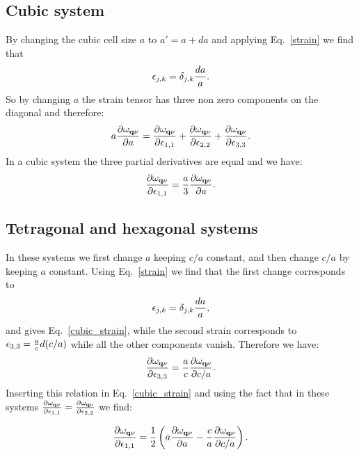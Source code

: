 \documentclass[12pt,a4paper,twoside]{report}
\begin{document}
{\color{web-blue}\subsection{Cubic system}}
\color{black}

By changing the cubic cell size $a$ to $a'=a+da$ and applying Eq.~\ref{strain}
we find that
\begin{equation}
\epsilon_{j,k}=\delta_{j,k} {da \over a}.
\end{equation}
So by changing $a$ the strain tensor has three non zero components on the
diagonal and therefore:
\begin{equation}
a {\partial \omega_{{\bf q}\nu} \over \partial a} = 
{\partial \omega_{{\bf q}\nu} \over \partial 
\epsilon_{1,1}} + {\partial  \omega_{{\bf q}\nu} \over \partial 
\epsilon_{2,2}} + {\partial  \omega_{{\bf q}\nu} \over \partial 
\epsilon_{3,3}}.
\label{cubic_strain}
\end{equation}
In a cubic system the three partial derivatives 
are equal and we have:
\begin{equation}
{\partial \omega_{{\bf q}\nu} 
\over \partial \epsilon_{1,1}} = {a \over 3} {\partial
 \omega_{{\bf q}\nu} \over \partial a}.
\end{equation}
%
{\color{web-blue}\subsection{Tetragonal and hexagonal systems}}
\color{black}

In these systems we first change $a$ keeping $c/a$ constant, and then
change $c/a$ by keeping $a$ constant. Using Eq.~\ref{strain} we find that
the first change corresponds to
\begin{equation}
\epsilon_{j,k}=\delta_{j,k} {da \over a},
\end{equation}
and gives Eq.~\ref{cubic_strain}, while the second strain corresponds
to $\epsilon_{3,3}= {a \over c} d (c/a) $ while all the other
components vanish. Therefore we have:
\begin{equation}
{\partial \omega_{{\bf q}\nu} 
\over \partial \epsilon_{3,3}} = {a \over c} {\partial \omega_{{\bf q}\nu} 
\over \partial c/a}.
\end{equation}
Inserting this relation in Eq.~\ref{cubic_strain} and using the fact that
in these systems 
${\partial \omega_{{\bf q}\nu} \over \partial \epsilon_{1,1}}=
{\partial \omega_{{\bf q}\nu} \over \partial \epsilon_{2,2}}$ we find:

\begin{equation}
{\partial \omega_{{\bf q}\nu} \over \partial \epsilon_{1,1}} = {1\over 2} 
\left(a  
{\partial \omega_{{\bf q}\nu} \over \partial a} -
{c\over a} {\partial \omega_{{\bf q}\nu} \over \partial c/a}\right).
\end{equation}
 
\end{document}

